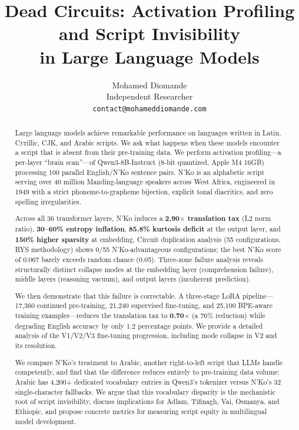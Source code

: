 \documentclass[11pt]{article}
\title{Dead Circuits: Activation Profiling and Script Invisibility\\in Large Language Models}
\author{
  Mohamed Diomande \\
  Independent Researcher \\
  \texttt{contact@mohameddiomande.com}
}
\begin{document}
\maketitle

\begin{abstract}
Large language models achieve remarkable performance on languages written in Latin, Cyrillic, CJK, and Arabic scripts.
We ask what happens when these models encounter a script that is absent from their pre-training data.
We perform activation profiling---a per-layer ``brain scan''---of Qwen3-8B-Instruct (8-bit quantized, Apple M4 16GB) processing 100 parallel English/N'Ko sentence pairs.
N'Ko is an alphabetic script serving over 40 million Manding-language speakers across West Africa, engineered in 1949 with a strict phoneme-to-grapheme bijection, explicit tonal diacritics, and zero spelling irregularities.

Across all 36 transformer layers, N'Ko induces a \textbf{2.90$\times$ translation tax} (L2 norm ratio), \textbf{30--60\% entropy inflation}, \textbf{85.8\% kurtosis deficit} at the output layer, and \textbf{150\% higher sparsity} at embedding.
Circuit duplication analysis (55 configurations, RYS methodology) shows 0/55 N'Ko-advantageous configurations; the best N'Ko score of 0.067 barely exceeds random chance (0.05).
Three-zone failure analysis reveals structurally distinct collapse modes at the embedding layer (comprehension failure), middle layers (reasoning vacuum), and output layers (incoherent prediction).

We then demonstrate that this failure is correctable.
A three-stage LoRA pipeline---17,360 continued pre-training, 21,240 supervised fine-tuning, and 25,100 BPE-aware training examples---reduces the translation tax to \textbf{0.70$\times$} (a 76\% reduction) while degrading English accuracy by only 1.2 percentage points.
We provide a detailed analysis of the V1/V2/V3 fine-tuning progression, including mode collapse in V2 and its resolution.

We compare N'Ko's treatment to Arabic, another right-to-left script that LLMs handle competently, and find that the difference reduces entirely to pre-training data volume: Arabic has 4,200+ dedicated vocabulary entries in Qwen3's tokenizer versus N'Ko's 32 single-character fallbacks.
We argue that this vocabulary disparity is the mechanistic root of script invisibility, discuss implications for Adlam, Tifinagh, Vai, Osmanya, and Ethiopic, and propose concrete metrics for measuring script equity in multilingual model development.
\end{abstract}
\end{document}
